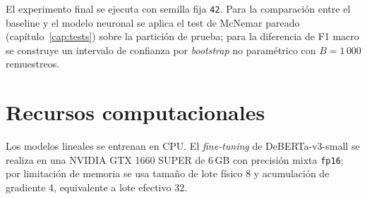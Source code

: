 El experimento final se ejecuta con semilla fija \texttt{42}. Para la
comparación entre el baseline y el modelo neuronal se aplica el test
de McNemar pareado (capítulo~\ref{cap:tests}) sobre la partición de
prueba; para la diferencia de F1 macro se construye un intervalo de
confianza por \emph{bootstrap} no paramétrico con $B = 1\,000$
remuestreos.

\section{Recursos computacionales}

Los modelos lineales se entrenan en CPU. El \emph{fine-tuning} de
DeBERTa-v3-small se realiza en una NVIDIA GTX 1660 SUPER de 6\,GB con
precisión mixta \texttt{fp16}; por limitación de memoria se usa tamaño
de lote físico 8 y acumulación de gradiente 4, equivalente a lote
efectivo 32.
